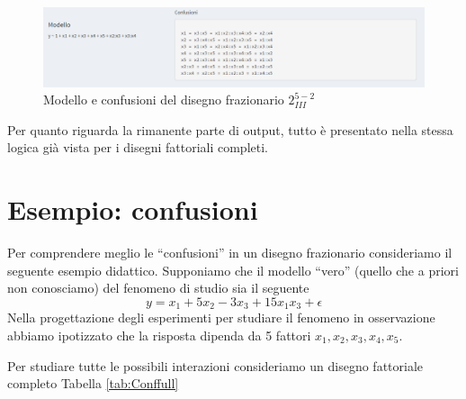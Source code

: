 \documentclass[
  11pt,
]{book}
\begin{document}
\begin{figure}[ht]

{\centering \includegraphics[width=1\linewidth]{Immagini/Fraz/03_confusioni} 

}

\caption{Modello e confusioni del disegno frazionario $2_{III}^{5-2}$}\label{fig:fz3}
\end{figure}

Per quanto riguarda la rimanente parte di output, tutto è presentato nella stessa logica già vista per i disegni fattoriali completi.

\hypertarget{esempio-confusioni}{%
\section{Esempio: confusioni}\label{esempio-confusioni}}

Per comprendere meglio le ``confusioni'' in un disegno frazionario consideriamo il seguente esempio didattico. Supponiamo che il modello ``vero'' (quello che a priori non conosciamo) del fenomeno di studio sia il seguente
\[
y=x_1+5x_2-3x_3+15x_1x_3+\epsilon
\]
Nella progettazione degli esperimenti per studiare il fenomeno in osservazione abbiamo ipotizzato che la risposta dipenda da 5 fattori \(x_1,x_2,x_3,x_4,x_5\).

Per studiare tutte le possibili interazioni consideriamo un disegno fattoriale completo Tabella \ref{tab:Conffull}
\end{document}

